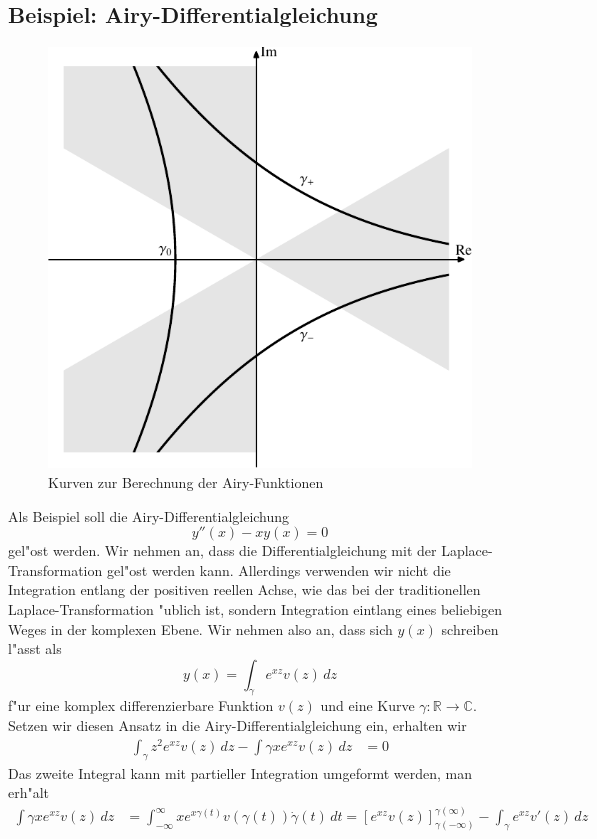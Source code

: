 \subsection{Beispiel: Airy-Differentialgleichung}
\begin{figure}
\centering
\includegraphics{chapters/images/airy-1.pdf}
\caption{Kurven zur Berechnung der Airy-Funktionen
\label{komplex:airy}}
\end{figure}
Als Beispiel soll die Airy-Differentialgleichung
\[
y''(x)-xy(x)=0
\]
gel"ost werden.
Wir nehmen an, dass die Differentialgleichung mit der Laplace-Transformation
gel"ost werden kann.
Allerdings verwenden wir nicht die Integration entlang der positiven
reellen Achse, wie das bei der traditionellen Laplace-Transformation
"ublich ist, sondern Integration eintlang eines beliebigen Weges in
der komplexen Ebene.
Wir nehmen also an, dass sich $y(x)$ schreiben l"asst als
\[
y(x)=\int_\gamma e^{xz}v(z)\,dz
\]
f"ur eine komplex differenzierbare Funktion $v(z)$ und eine Kurve
$\gamma\colon\mathbb R\to \mathbb C$.
Setzen wir diesen Ansatz in die Airy-Differentialgleichung ein,
erhalten wir
\begin{align*}
\int_\gamma z^2e^{xz}v(z)\,dz-\int\gamma xe^{xz}v(z)\,dz&=0
\end{align*}
Das zweite Integral kann mit partieller Integration umgeformt werden,
man erh"alt
\begin{align*}
\int\gamma xe^{xz}v(z)\,dz
&=
\int_{-\infty}^{\infty} xe^{x\gamma(t)}v(\gamma(t))\dot\gamma(t)\,dt
=
\left[e^{xz}v(z)\right]_{\gamma(-\infty)}^{\gamma(\infty)}
-\int_\gamma e^{xz}v'(z)\,dz
\end{align*}
